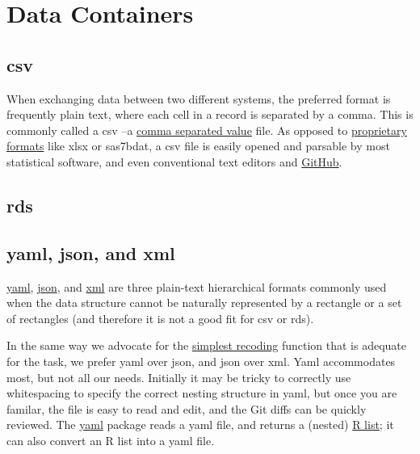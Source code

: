 \documentclass[
]{book}
\begin{document}
\hypertarget{data-containers}{%
\section{Data Containers}\label{data-containers}}

\hypertarget{data-containers-csv}{%
\subsection{csv}\label{data-containers-csv}}

When exchanging data between two different systems, the preferred format is frequently plain text, where each cell in a record is separated by a comma. This is commonly called a csv --a \href{https://en.wikipedia.org/wiki/Comma-separated_values}{comma separated value} file. As opposed to \protect\hyperlink{data-containers-avoid}{proprietary formats} like xlsx or sas7bdat, a csv file is easily opened and parsable by most statistical software, and even conventional text editors and \href{https://help.github.com/en/github/managing-files-in-a-repository/rendering-csv-and-tsv-data}{GitHub}.

\hypertarget{data-containers-rds}{%
\subsection{rds}\label{data-containers-rds}}

\hypertarget{data-containers-yaml}{%
\subsection{yaml, json, and xml}\label{data-containers-yaml}}

\href{https://circleci.com/blog/what-is-yaml-a-beginner-s-guide/}{yaml}, \href{https://www.w3schools.com/js/js_json_intro.asp}{json}, and \href{https://www.w3schools.com/xml/}{xml} are three plain-text hierarchical formats commonly used when the data structure cannot be naturally represented by a rectangle or a set of rectangles (and therefore it is not a good fit for csv or rds).

In the same way we advocate for the \href{https://ouhscbbmc.github.io/data-science-practices-1/coding.html\#coding-simplify-recoding}{simplest recoding} function that is adequate for the task, we prefer yaml over json, and json over xml. Yaml accommodates most, but not all our needs. Initially it may be tricky to correctly use whitespacing to specify the correct nesting structure in yaml, but once you are familar, the file is easy to read and edit, and the Git diffs can be quickly reviewed. The \href{http://biostat.mc.vanderbilt.edu/wiki/Main/YamlR}{yaml} package reads a yaml file, and returns a (nested) \href{https://www.tutorialspoint.com/r/r_lists.htm}{R list}; it can also convert an R list into a yaml file.
\end{document}
